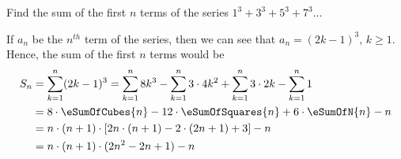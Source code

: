 
%
%
%
%
% 
% 

\question Find the sum of the first $n$ terms of the series $1^3 + 3^3 + 5^3 + 7^3 \ldots$ 

\insertQR{}

\ifprintanswers
\fi 

\begin{solution}
	If $a_n$ be the $n^{th}$ term of the series, then we can see that $a_n = (2k-1)^3,\, k \geq 1$.
	Hence, the sum of the first $n$ terms would be 
	\begin{align}
		S_n &= \sum_{k=1}^{n}(2k-1)^3 = \sum_{k=1}^{n}8k^3 - 
		\sum_{k=1}^{n}3\cdot 4k^2 + \sum_{k=1}^{n}3\cdot 2k - \sum_{k=1}^{n} 1 \\
		&= 8\cdot\eSumOfCubes{n} - 12\cdot\eSumOfSquares{n} + 6\cdot\eSumOfN{n} - n \\
		&= n\cdot(n+1)\cdot[2n\cdot(n+1) - 2\cdot(2n+1) + 3 ] - n \\
		&= n\cdot(n+1)\cdot(2n^2-2n+1) - n
	\end{align}
\end{solution}
 